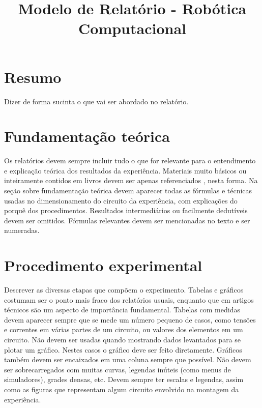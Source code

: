\documentclass[10pt,conference]{IEEEtran}                      %
\begin{document}
\title{Modelo de Relatório - Robótica Computacional}
%
%
\author{
}
\maketitle
\section{Resumo}
Dizer de forma sucinta o que vai ser abordado no relatório.
\section{Fundamentação teórica}
Os relatórios devem sempre incluir tudo o que for relevante para o entendimento e explicação teórica dos resultados da experiência. Materiais muito básicos ou inteiramente contidos em livros devem ser apenas referenciados , nesta forma. Na seção sobre fundamentação teórica devem aparecer todas as fórmulas e técnicas usadas no dimensionamento do circuito da experiência, com explicações do porquê dos procedimentos. Resultados 
intermediários ou facilmente dedutíveis devem ser omitidos. Fórmulas relevantes devem ser mencionadas no texto e ser numeradas.
\section{Procedimento experimental}
Descrever as diversas etapas que compõem o experimento. Tabelas e gráficos costumam ser o ponto mais fraco 
dos relatórios usuais, enquanto que em artigos técnicos são um aspecto de importância fundamental. 
Tabelas com medidas devem aparecer sempre que se mede um número pequeno de casos, como tensões e correntes em várias partes de um circuito, ou valores dos elementos em um circuito. Não devem ser usadas quando mostrando dados levantados para se plotar um gráfico. Nestes casos o gráfico deve ser feito diretamente. 
Gráficos também devem ser encaixados em uma coluna sempre que possível. Não devem ser sobrecarregados com muitas curvas, legendas inúteis (como menus de simuladores), grades densas, etc. Devem sempre ter escalas e legendas, assim como as figuras que representam algum circuito envolvido na montagem da experiência.
\end{document}

